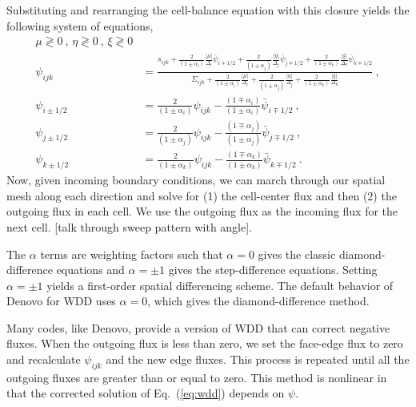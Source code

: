 \documentclass[12pt]{article}
\newcommand{\Di}{\ensuremath{\Delta_i}}
\newcommand{\Dj}{\ensuremath{\Delta_j}}
\newcommand{\Dk}{\ensuremath{\Delta_k}}
\begin{document}
Substituting and rearranging the cell-balance
equation with this closure yields the following system of equations,
\begin{equation}
  \begin{aligned} \mu\gtrless0\:,\,\eta\gtrless0\:,\,\xi\gtrless0\\
    \psi_{ijk} &= \frac{s_{ijk} +
      \frac{2}{(1\pm\alpha_i)}\frac{|\mu|}{\Di}\bar{\psi}_{i\mp1/2} +
      \frac{2}{(1\pm\alpha_j)}\frac{|\eta|}{\Dj}\bar{\psi}_{j\mp1/2} +
      \frac{2}{(1\pm\alpha_k)}\frac{|\xi|}{\Dk}\bar{\psi}_{k\mp1/2}}{
      \Sigma_{ijk} + \frac{2}{(1\pm\alpha_i)}\frac{|\mu|}{\Di} +
      \frac{2}{(1\pm\alpha_j)}\frac{|\eta|}{\Dj} +
      \frac{2}{(1\pm\alpha_k)}\frac{|\xi|}{\Dk} }\:,\\
    \psi_{i\pm1/2} &= \frac{2}{(1\pm\alpha_i)}\psi_{ijk}-
    \frac{(1\mp\alpha_i)}{(1\pm\alpha_i)}\bar{\psi}_{i\mp1/2}\:,\\
    \psi_{j\pm1/2} &= \frac{2}{(1\pm\alpha_j)}\psi_{ijk}-
    \frac{(1\mp\alpha_j)}{(1\pm\alpha_j)}\bar{\psi}_{j\mp1/2}\:,\\
    \psi_{k\pm1/2} &= \frac{2}{(1\pm\alpha_k)}\psi_{ijk}-
    \frac{(1\mp\alpha_k)}{(1\pm\alpha_k)}\bar{\psi}_{k\mp1/2}\:.
  \end{aligned}
  \label{eq:wdd}
\end{equation}
Now, given incoming boundary conditions, we can march through our spatial mesh along each direction and solve for (1) the cell-center flux and then (2) the outgoing flux in each cell. We use the outgoing flux as the incoming flux for the next cell. [talk through sweep pattern with angle].

The $\alpha$
terms are weighting factors such that $\alpha=0$ gives the classic
diamond-difference equations and $\alpha = \pm 1$ gives the step-difference
equations.  Setting $\alpha = \pm 1$ yields a first-order spatial differencing
scheme.  The default behavior of Denovo for WDD uses $\alpha=0$, which gives
the diamond-difference method.

Many codes, like Denovo, provide a version of WDD that can correct negative fluxes.  When the outgoing flux is less than zero, we set the face-edge flux to zero and
recalculate $\psi_{ijk}$ and the new edge fluxes.  This process is repeated
until all the outgoing fluxes are greater than or equal to zero.  This method
is nonlinear in that the corrected solution of Eq.~(\ref{eq:wdd}) depends on
$\psi$.
\end{document}
